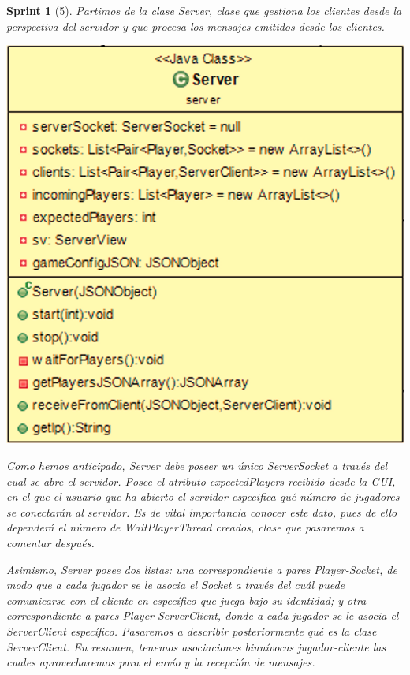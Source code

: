 \documentclass{article}
\theoremstyle{break}
\newtheorem*{sprint}{Sprint}
\begin{document}
\begin{sprint}[5]
Partimos de la clase Server, clase que gestiona los clientes desde la perspectiva del servidor y que procesa los mensajes emitidos desde los clientes.

\begin{center}
\includegraphics[scale=0.3]{Server-sprint5.png} 
\end{center}

Como hemos anticipado, Server debe poseer un único ServerSocket a través del cual se abre el servidor. Posee el atributo expectedPlayers recibido desde la GUI, en el que el usuario que ha abierto el servidor especifica qué número de jugadores se conectarán al servidor. Es de vital importancia conocer este dato, pues de ello dependerá el número de WaitPlayerThread creados, clase que pasaremos a comentar después.

Asimismo, Server posee dos listas: una correspondiente a pares Player-Socket, de modo que a cada jugador se le asocia el Socket a través del cuál puede comunicarse con el cliente en específico que juega bajo su identidad; y otra correspondiente a pares Player-ServerClient, donde a cada jugador se le asocia el ServerClient específico. Pasaremos a describir posteriormente qué es la clase ServerClient.
En resumen, tenemos asociaciones biunívocas jugador-cliente las cuales aprovecharemos para el envío y la recepción de mensajes.



\end{sprint}
\end{document}
